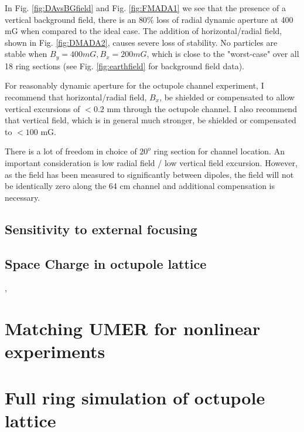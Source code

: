 In Fig. \ref{fig:DAvsBGfield} and Fig. \ref{fig:FMADA1} we see that the presence of a vertical background field, there is an $80\%$ loss of radial dynamic aperture at 400 mG when compared to the ideal case. The addition of horizontal/radial field, shown in Fig. \ref{fig:DMADA2}, causes severe loss of stability. No particles are stable when $B_y=400 mG, B_x=200 mG$, which is close to the "worst-case" over all 18 ring sections (see Fig. \ref{fig:earthfield} for background field data). 

For reasonably dynamic aperture for the octupole channel experiment, I recommend that horizontal/radial field, $B_x$, be shielded or compensated to allow vertical excursions of $<0.2$ mm through the octupole channel. I also recommend that vertical field, which is in general much stronger, be shielded or compensated to $< 100$ mG. 

There is a lot of freedom in choice of $20^o$ ring section for channel location. An important consideration is low radial field / low vertical field excursion. However, as the field has been measured to significantly between dipoles, the field will not be identically zero along the 64 cm channel and additional compensation is necessary. 



\subsection{Sensitivity to external focusing}

\subsection{Space Charge in octupole lattice}

\cite{Webb2013}, \cite{WebbIPAC2013} %

\section{Matching UMER for nonlinear experiments}


\section{Full ring simulation of octupole lattice}


